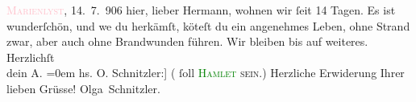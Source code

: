            \textsc{{\pb}\textcolor{pink}{Marienlyst}{}\ledrightnote{\textcolor{pink}{Marienlyst}}}, 14. 7. 906\pend
           \pstart
           hier, lieber Hermann, wohnen wir ſeit 14 Tagen. Es ist wunderſchön,
               und we{\geminationn} du herkämſt, kö{\geminationn}teſt du ein angenehmes Leben, ohne Strand zwar, aber auch ohne Brandwunden führen.
               Wir bleiben bis auf weiteres.\pend
           \pstart
           Herzlichſt{\\[\baselineskip]}dein \spacefill\mbox{A.}\pend
           \leftskip=0em{}\pstart
           \noindent{}{\pb}{[}hs. O. Schnitzler:{]} (\label{T_L01612_1v}\label{T_L01612_1h} ſoll \textsc{\textcolor{green}{Hamlet}{} sein.})\pend
           \pstart Herzliche Erwiderung Ihrer lieben Grüsse!
               { }\spacefill\mbox{Olga Schnitzler.}\pend{}\endnumbering{}  
      